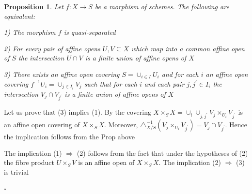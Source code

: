 \documentclass{article}
\newtheorem{proposition}[theorem]{Proposition}
\newenvironment{Proof}{{\noindent \indent \it Proof:\quad}}{\hfill $\square$\par}
\begin{document}
\begin{proposition}
    Let $f:X \to S$ be a morphism of schemes. The following are equivalent:

1) The morphism $f$ is quasi-separated

2) For every pair of affine opens $U,V\subseteq X$ which map into a common affine open of $S$ the intersection $U\cap V$ is a finite union of affine opens of $X$

3) There exists an affine open covering $S=\cup_{i\in I}U_i$ and for each $i$ an affine open covering $f^{-1}U_i=\cup_{j\in I_i}V_j$ such that for each $i$ and each pair $j,j^\prime\in I_i$ the intersection $V_j\cap V_{j^\prime}$ is a finite union of affine opens of $X$
\end{proposition}
\begin{Proof}
    Let us prove that (3) implies (1). By the covering $X\times_SX=\cup_i\cup_{j,j^\prime}V_j\times_{U_i}V_{j^\prime}$ is an affine open covering of $X\times_SX$. Moreover, $\triangle^{-1}_{X/S}(V_j\times_{U_i}V_{j^\prime})=V_j \cap V_{j^\prime}$. Hence the implication follows from the Prop above

    The implication (1) $\Rightarrow$ (2) follows from the fact that under the hypotheses of (2) the fibre product $U\times_SV$ is an affine open of $X\times_SX$. The implication (2) $\Rightarrow$ (3) is trivial
    
\end{Proof}
\end{document}
